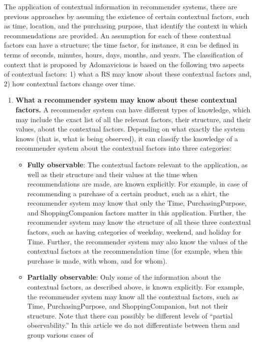 The application of contextual information in recommender systems, there are %
previous approaches by assuming the existence of certain contextual         %
factors, such as time, location, and the purchasing purpose, that
identify the context in which recommendations are provided. An
assumption for each of these contextual factors can have a structure;
the time factor, for instance, it can be defined in terms of seconds,
minutes, hours, days, months, and years. The classification of context
that is proposed by Adomavicious\cite{adomavicius2011context} is based on the
following two aspects of contextual factors: 1) what a RS may know
about these contextual factors and, 2) how contextual factors change
over time.
\begin{enumerate}
\item \textbf{What a recommender system may know about these contextual factors.} 
A recommender system can have different types of knowledge, which may include 
the exact list of all the relevant factors, their structure, and their values, 
about the contextual factors. Depending on what exactly the system knows (that 
is, what is being observed), it can classify the knowledge of a recommender 
system about the contextual factors into three categories: 
	\begin{itemize}
	\item \textbf{Fully observable}: The contextual factors relevant to the 
	application, as well as their structure and their values at the time when 
	recommendations are made, are known explicitly. For example, in case 
	of recommending a purchase of a certain product, such as a shirt, the 
	recommender system may know that only the Time, PurchasingPurpose, and 
	ShoppingCompanion factors matter in this application. Further, the 
	recommender system may know the structure of all these three contextual 
	factors, such as having categories of weekday, weekend, and holiday for 
	Time. Further, the recommender system may also know the values of the 
	contextual factors at the recommendation time (for example, when this 
	purchase is made, with whom, and for whom).
	\item \textbf{Partially observable}: Only some of the information about 
	the contextual factors, as described above, is known explicitly. For example, 
	the recommender system may know all the contextual factors, such as Time, 
	PurchasingPurpose, and ShoppingCompanion, but not their structure. Note that 
	there can possibly be different levels of “partial observability.” In this 
	article we do not differentiate between them and group various cases of 

\end{itemize}
\end{enumerate}
